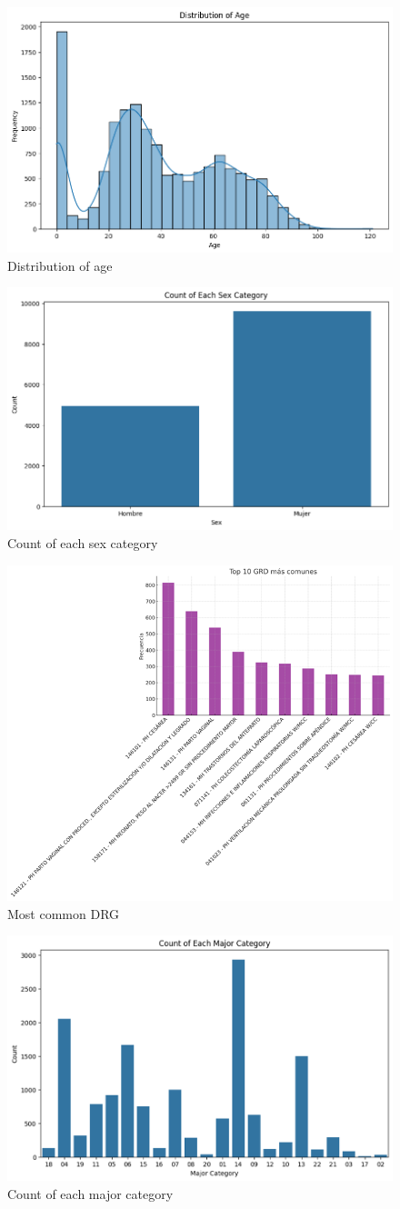 \documentclass{ieeeaccess}
\begin{document}
\begin{figure}
    \centering
    \includegraphics[width=0.5\linewidth]{image2.png}
    \caption{Distribution of age}
    \label{fig:enter-label}
\end{figure}

\begin{figure}
    \centering
    \includegraphics[width=0.5\linewidth]{image.png}
    \caption{Count of each sex category}
    \label{fig:enter-label}
\end{figure}

\begin{figure}
    \centering
    \includegraphics[width=0.5\linewidth]{image3.png}
    \caption{Most common DRG}
    \label{fig:enter-label}
\end{figure}

\begin{figure}
    \centering
    \includegraphics[width=0.5\linewidth]{image4.png}
    \caption{Count of each major category}
    \label{fig:enter-label}
\end{figure}
\end{document}
